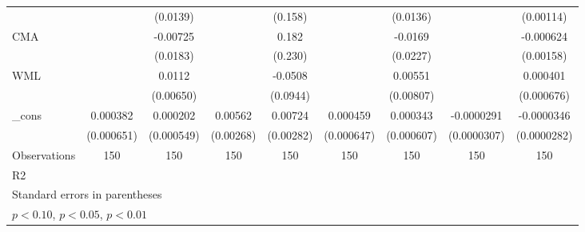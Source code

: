 \begin{table}[htbp]
\begin{tabular}{l*{8}{c}}
                    &                     &    (0.0139)         &                     &     (0.158)         &                     &    (0.0136)         &                     &   (0.00114)         \\
CMA                 &                     &    -0.00725         &                     &       0.182         &                     &     -0.0169         &                     &   -0.000624         \\
                    &                     &    (0.0183)         &                     &     (0.230)         &                     &    (0.0227)         &                     &   (0.00158)         \\
WML                 &                     &      0.0112\sym{*}  &                     &     -0.0508         &                     &     0.00551         &                     &    0.000401         \\
                    &                     &   (0.00650)         &                     &    (0.0944)         &                     &   (0.00807)         &                     &  (0.000676)         \\
\_cons              &    0.000382         &    0.000202         &     0.00562\sym{**} &     0.00724\sym{**} &    0.000459         &    0.000343         &  -0.0000291         &  -0.0000346         \\
                    &  (0.000651)         &  (0.000549)         &   (0.00268)         &   (0.00282)         &  (0.000647)         &  (0.000607)         & (0.0000307)         & (0.0000282)         \\
\hline
Observations        &         150         &         150         &         150         &         150         &         150         &         150         &         150         &         150         \\
R2                  &                     &                     &                     &                     &                     &                     &                     &                     \\
\hline\hline
\multicolumn{9}{l}{\footnotesize Standard errors in parentheses}\\
\multicolumn{9}{l}{\footnotesize \sym{*} \(p<0.10\), \sym{**} \(p<0.05\), \sym{***} \(p<0.01\)}\\
\end{tabular}
\end{table}
